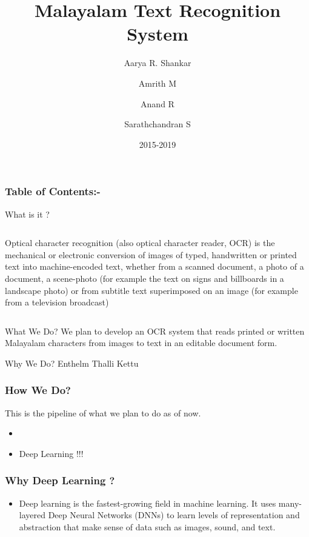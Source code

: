 \documentclass{beamer}
\title{Malayalam Text Recognition System}
\author{Aarya R. Shankar
			\and Amrith M
				 \and Anand R
					\and Sarathchandran S}
\institute{Department of Computer Science\and College of Engineering,Trivandrum}
\date{2015-2019}
\begin{document}
 
 
\frame{\titlepage}





\begin{frame}
\frametitle{Table of Contents:-}
\tableofcontents
\end{frame}


\begin{frame}{What is it ?}

    \begin{columns}[c] %
    \column{\textwidth} %
     Optical character recognition (also optical character reader, OCR) is the mechanical or electronic conversion of images of typed, 
handwritten or printed text into machine-encoded text, whether from a scanned document, a photo of a document, a scene-photo (for example the 
text on signs and billboards in a landscape photo) or from subtitle text superimposed on an image (for example from a television broadcast)
    \end{columns}
\end{frame}



\begin{frame}{What We Do?}
     We plan to develop an OCR system that reads printed or written Malayalam characters from images to text in an editable document form.
\end{frame}

\begin{frame}{Why We Do?}
     Enthelm Thalli Kettu
\end{frame}



\begin{frame}
\frametitle{How We Do?}
This is the pipeline of what we plan to do as of now. 
 
\begin{itemize}
 \item{}
 \item<2-> Deep Learning !!!
\end{itemize}
 
\end{frame}

\begin{frame}
\frametitle{Why Deep Learning ?}
\begin{itemize}
 \item<1->Deep learning is the fastest-growing field in machine learning. It uses many-layered Deep Neural Networks (DNNs) to learn levels of 
representation and abstraction that make sense of data such as images, sound, and text.
\end{itemize}
 
\end{frame}
\end{document}

